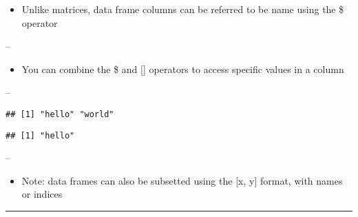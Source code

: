 \documentclass[]{article}
\newenvironment{Shaded}{\begin{snugshade}}{\end{snugshade}}
\newcommand{\DataTypeTok}[1]{\textcolor[rgb]{0.13,0.29,0.53}{#1}}
\newcommand{\DecValTok}[1]{\textcolor[rgb]{0.00,0.00,0.81}{#1}}
\newcommand{\KeywordTok}[1]{\textcolor[rgb]{0.13,0.29,0.53}{\textbf{#1}}}
\newcommand{\NormalTok}[1]{#1}
\newcommand{\OperatorTok}[1]{\textcolor[rgb]{0.81,0.36,0.00}{\textbf{#1}}}
\newcommand{\OtherTok}[1]{\textcolor[rgb]{0.56,0.35,0.01}{#1}}
\newcommand{\StringTok}[1]{\textcolor[rgb]{0.31,0.60,0.02}{#1}}
\providecommand{\tightlist}{%
  \setlength{\itemsep}{0pt}\setlength{\parskip}{0pt}}
\begin{document}
\begin{itemize}
\tightlist
\item
  Unlike matrices, data frame columns can be referred to be name using
  the \$ operator
\end{itemize}

--

\begin{itemize}
\tightlist
\item
  You can combine the \$ and {[}{]} operators to access specific values
  in a column
\end{itemize}

--

\begin{Shaded}
\end{Shaded}

\begin{verbatim}
## [1] "hello" "world"
\end{verbatim}

\begin{Shaded}
\end{Shaded}

\begin{verbatim}
## [1] "hello"
\end{verbatim}

--

\begin{itemize}
\tightlist
\item
  Note: data frames can also be subsetted using the {[}x, y{]} format,
  with names or indices
\end{itemize}

\begin{center}\rule{0.5\linewidth}{\linethickness}\end{center}
\end{document}
